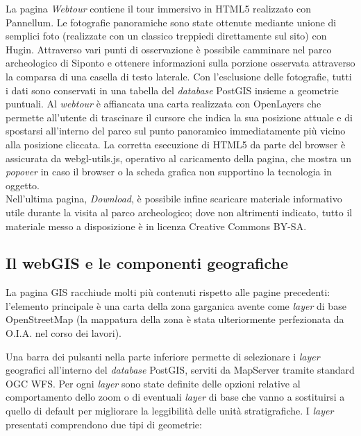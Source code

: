 \documentclass{paper}
\begin{document}
        La pagina \emph{Webtour} contiene il tour immersivo in HTML5 realizzato con Pannellum. Le fotografie panoramiche sono state ottenute mediante unione di semplici foto (realizzate con un classico treppiedi direttamente sul sito) con Hugin. Attraverso vari punti di osservazione è possibile camminare nel parco archeologico di Siponto e ottenere informazioni sulla porzione osservata attraverso la comparsa di una casella di testo laterale. Con l'esclusione delle fotografie, tutti i dati sono conservati in una tabella del \textit{database} PostGIS insieme a geometrie puntuali. Al \textit{webtour} è affiancata una carta realizzata con OpenLayers che permette all'utente di trascinare il cursore che indica la sua posizione attuale e di spostarsi all'interno del parco sul punto panoramico immediatamente più vicino alla posizione cliccata. La corretta esecuzione di HTML5 da parte del browser è assicurata da webgl-utils.js, operativo al caricamento della pagina, che mostra un \textit{popover} in caso il browser o la scheda grafica non supportino la tecnologia in oggetto.\\

        Nell'ultima pagina, \emph{Download}, è possibile infine scaricare materiale informativo utile durante la visita al parco archeologico; dove non altrimenti indicato, tutto il materiale messo a disposizione è in licenza Creative Commons BY-SA.

    \subsection{Il webGIS e le componenti geografiche}

        La pagina GIS racchiude molti più contenuti rispetto alle pagine precedenti: l'elemento principale è una carta della zona garganica avente come \textit{layer} di base OpenStreetMap (la mappatura della zona è stata ulteriormente perfezionata da O.I.A. nel corso dei lavori).

        Una barra dei pulsanti nella parte inferiore permette di selezionare i \textit{layer} geografici all'interno del \textit{database} PostGIS, serviti da MapServer tramite standard OGC WFS. Per ogni \textit{layer} sono state definite delle opzioni relative al comportamento dello zoom o di eventuali \textit{layer} di base che vanno a sostituirsi a quello di default per migliorare la leggibilità delle unità stratigrafiche. I \textit{layer} presentati comprendono due tipi di geometrie:
\end{document}
